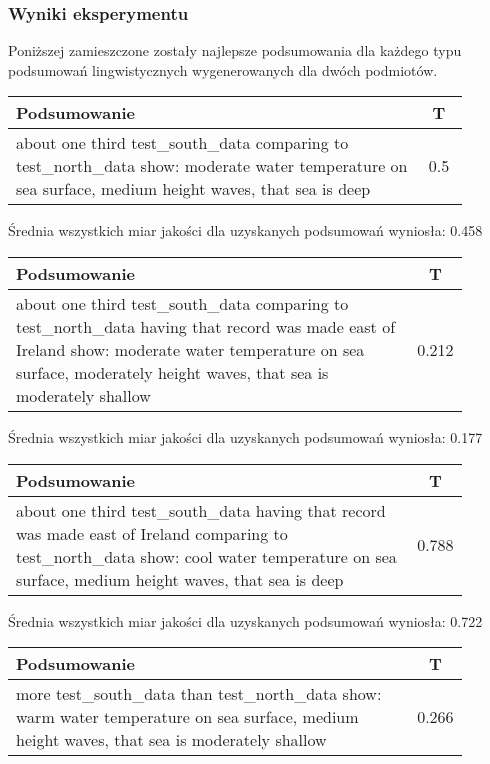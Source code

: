 \documentclass{article}
\begin{document}
\subsubsection{Wyniki eksperymentu}

\noindent Poniższej zamieszczone zostały najlepsze podsumowania dla każdego typu podsumowań lingwistycznych wygenerowanych dla dwóch podmiotów.

\begin{longtable}{|p{0.9\linewidth}|c|}
\hline
\textbf{Podsumowanie} & \textbf{T} \\
\hline
about one third test\_south\_data comparing to test\_north\_data show: moderate water temperature on sea surface, medium height waves, that sea is deep & 0.5 \\
\hline
\end{longtable}

\noindent Średnia wszystkich miar jakości dla uzyskanych podsumowań wyniosła: 0.458

\begin{longtable}{|p{0.9\linewidth}|c|}
\hline
\textbf{Podsumowanie} & \textbf{T} \\
\hline
about one third test\_south\_data comparing to test\_north\_data having that record was made east of Ireland show: moderate water temperature on sea surface, moderately height waves, that sea is moderately shallow & 0.212 \\
\hline
\end{longtable}

\noindent Średnia wszystkich miar jakości dla uzyskanych podsumowań wyniosła: 0.177

\begin{longtable}{|p{0.9\linewidth}|c|}
\hline
\textbf{Podsumowanie} & \textbf{T} \\
\hline
about one third test\_south\_data having that record was made east of Ireland comparing to test\_north\_data show: cool water temperature on sea surface, medium height waves, that sea is deep & 0.788 \\
\hline
\end{longtable}

\noindent Średnia wszystkich miar jakości dla uzyskanych podsumowań wyniosła: 0.722

\begin{longtable}{|p{0.9\linewidth}|c|}
\hline
\textbf{Podsumowanie} & \textbf{T} \\
\hline
more test\_south\_data than test\_north\_data show: warm water temperature on sea surface, medium height waves, that sea is moderately shallow & 0.266 \\
\hline
\end{longtable}
\end{document}
